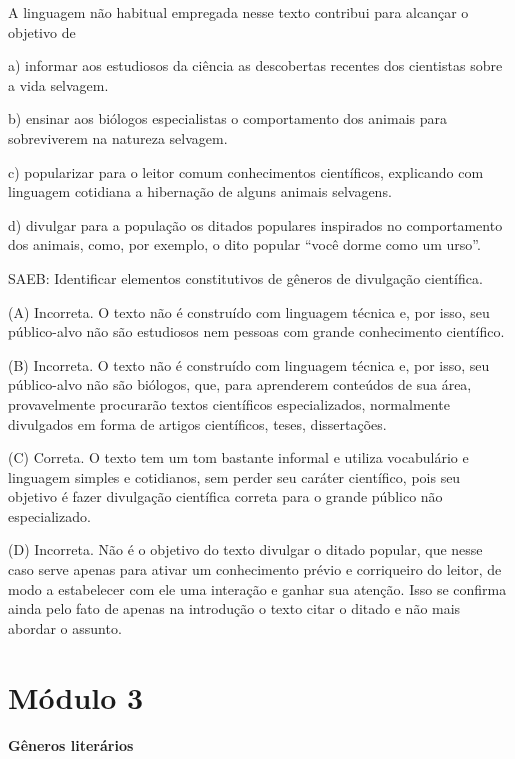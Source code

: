 
A linguagem não habitual empregada nesse texto contribui para alcançar o
objetivo de

a) informar aos estudiosos da ciência as descobertas recentes dos
cientistas sobre a vida selvagem.

b) ensinar aos biólogos especialistas o comportamento dos animais para
sobreviverem na natureza selvagem.

c) popularizar para o leitor comum conhecimentos científicos, explicando
com linguagem cotidiana a hibernação de alguns animais selvagens.

d) divulgar para a população os ditados populares inspirados no
comportamento dos animais, como, por exemplo, o dito popular ``você
dorme como um urso''.

SAEB: Identificar elementos constitutivos de gêneros de divulgação
científica.

(A) Incorreta. O texto não é construído com linguagem técnica e, por
isso, seu público-alvo não são estudiosos nem pessoas com grande
conhecimento científico.

(B) Incorreta. O texto não é construído com linguagem técnica e, por
isso, seu público-alvo não são biólogos, que, para aprenderem conteúdos
de sua área, provavelmente procurarão textos científicos especializados,
normalmente divulgados em forma de artigos científicos, teses,
dissertações.

(C) Correta. O texto tem um tom bastante informal e utiliza vocabulário
e linguagem simples e cotidianos, sem perder seu caráter científico,
pois seu objetivo é fazer divulgação científica correta para o grande
público não especializado.

(D) Incorreta. Não é o objetivo do texto divulgar o ditado popular, que
nesse caso serve apenas para ativar um conhecimento prévio e corriqueiro
do leitor, de modo a estabelecer com ele uma interação e ganhar sua
atenção. Isso se confirma ainda pelo fato de apenas na introdução o
texto citar o ditado e não mais abordar o assunto.


\section{Módulo 3}

\textbf{Gêneros literários}

